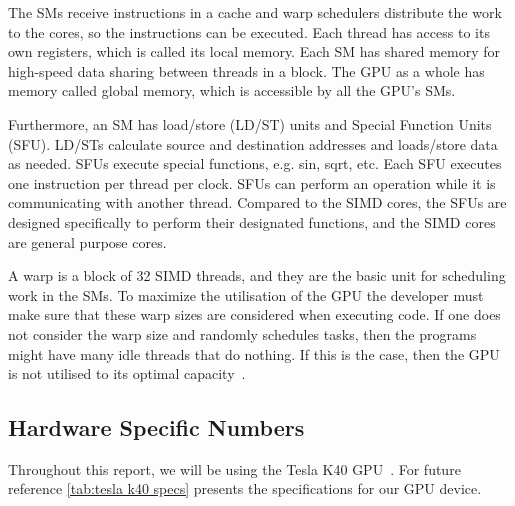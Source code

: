 The SMs receive instructions in a cache and warp schedulers distribute the work to the cores, so the instructions can be executed.
Each thread has access to its own registers, which is called its local memory.
Each SM has shared memory for high-speed data sharing between threads in a block.
The GPU as a whole has memory called global memory, which is accessible by all the GPU's SMs.

Furthermore, an SM has load/store (LD/ST) units and Special Function Units (SFU).
LD/STs calculate source and destination addresses and loads/store data as needed.
SFUs execute special functions, e.g. sin, sqrt, etc.
Each SFU executes one instruction per thread per clock.
SFUs can perform an operation while it is communicating with another thread.
Compared to the SIMD cores, the SFUs are designed specifically to perform their designated functions, and the SIMD cores are general purpose cores.

A warp is a block of 32 SIMD threads, and they are the basic unit for scheduling work in the SMs.
To maximize the utilisation of the GPU the developer must make sure that these warp sizes are considered when executing code.
If one does not consider the warp size and randomly schedules tasks, then the programs might have many idle threads that do nothing.
If this is the case, then the GPU is not utilised to its optimal capacity~\cite{fermi2009nvidia}.

\subsection{Hardware Specific Numbers}
\label{sec:hardware specific numbers}

Throughout this report, we will be using the Tesla K40 GPU~\cite{teslak402013nvidia}.
For future reference \cref{tab:tesla k40 specs} presents the specifications for our GPU device.

